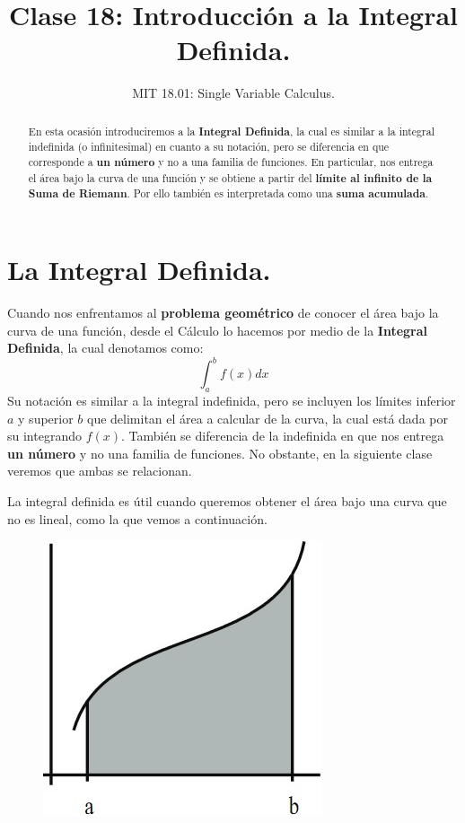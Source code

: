 \documentclass[12pt]{article}
\title{Clase 18: Introducción a la Integral Definida.}
\author{MIT 18.01: Single Variable Calculus.}
\date{}
\begin{document}
\maketitle

\begin{abstract}
{\noindent
En esta ocasión introduciremos a la \textbf{Integral Definida}, la cual es similar a la integral indefinida (o infinitesimal) en cuanto a su notación, pero se diferencia en que corresponde a \textbf{un número} y no a una familia de funciones. En particular, nos entrega el área bajo la curva de una función y se obtiene a partir del \textbf{límite al infinito de la Suma de Riemann}. Por ello también es interpretada como una \textbf{suma acumulada}.
}
\end{abstract}


\section{La Integral Definida.}

Cuando nos enfrentamos al \textbf{problema geométrico} de conocer el área bajo la curva de una función, desde el Cálculo lo hacemos por medio de la \textbf{Integral Definida}, la cual denotamos como:
\[
  \int_{a}^{b} f(x)dx
\]
Su notación es similar a la integral indefinida, pero se incluyen los límites inferior $a$ y superior $b$ que delimitan el área a calcular de la curva, la cual está dada por su integrando $f(x)$. También se diferencia de la indefinida en que nos entrega \textbf{un número} y no una familia de funciones. No obstante, en la siguiente clase veremos que ambas se relacionan.

La integral definida es útil cuando queremos obtener el área bajo una curva que no es lineal, como la que vemos a continuación.

\begin{figure}[hbt!]
\centering
\includegraphics[scale=0.5]{img/area-under-curve.jpg}
\end{figure}
\end{document}
